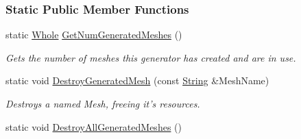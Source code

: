 \subsubsection*{Static Public Member Functions}
\begin{DoxyCompactItemize}
\item 
static \hyperlink{namespacephys_a460f6bc24c8dd347b05e0366ae34f34a}{Whole} \hyperlink{classphys_1_1MeshGenerator_a4ebb68b11fb56a73a2f196303e1059aa}{GetNumGeneratedMeshes} ()
\begin{DoxyCompactList}\small\item\em Gets the number of meshes this generator has created and are in use. \item\end{DoxyCompactList}\item 
static void \hyperlink{classphys_1_1MeshGenerator_afb2061375887b4e4a4ab387806ea69e2}{DestroyGeneratedMesh} (const \hyperlink{namespacephys_aa03900411993de7fbfec4789bc1d392e}{String} \&MeshName)
\begin{DoxyCompactList}\small\item\em Destroys a named Mesh, freeing it's resources. \item\end{DoxyCompactList}\item 
\hypertarget{classphys_1_1MeshGenerator_a7bc0a9b527251b8273b9da6772cc83c3}{
static void \hyperlink{classphys_1_1MeshGenerator_a7bc0a9b527251b8273b9da6772cc83c3}{DestroyAllGeneratedMeshes} ()}
\label{classphys_1_1MeshGenerator_a7bc0a9b527251b8273b9da6772cc83c3}


\end{DoxyCompactItemize}
